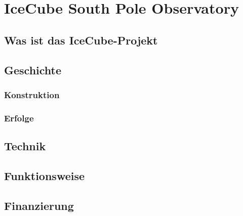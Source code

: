 \chapter{IceCube South Pole Observatory} 
    \vspace{8pt}
    \section{Was ist das IceCube-Projekt}
    \section{Geschichte}
    \subsection{Konstruktion}
    \subsection{Erfolge}
    \section{Technik}
    \section{Funktionsweise}
    \section{Finanzierung}